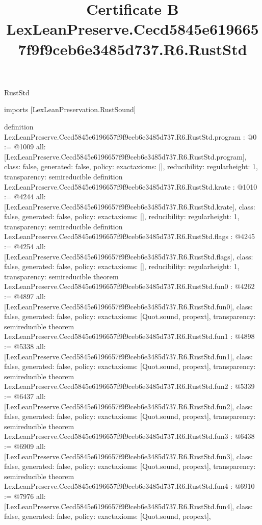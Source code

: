 \begin{lexlean}{RustStd}
\title{Certificate B LexLeanPreserve.Cecd5845e6196657f9f9ceb6e3485d737.R6.RustStd}
\begin{coremodule}
imports [LexLeanPreservation.RustSound]

definition LexLeanPreserve.Cecd5845e6196657f9f9ceb6e3485d737.R6.RustStd.program : @0 := @1009 {
  all: [LexLeanPreserve.Cecd5845e6196657f9f9ceb6e3485d737.R6.RustStd.program],
  class: false,
  generated: false,
  policy: exact{axioms: []},
  reducibility: regular{height: 1},
  transparency: semireducible
}
definition LexLeanPreserve.Cecd5845e6196657f9f9ceb6e3485d737.R6.RustStd.krate : @1010 := @4244 {
  all: [LexLeanPreserve.Cecd5845e6196657f9f9ceb6e3485d737.R6.RustStd.krate],
  class: false,
  generated: false,
  policy: exact{axioms: []},
  reducibility: regular{height: 1},
  transparency: semireducible
}
definition LexLeanPreserve.Cecd5845e6196657f9f9ceb6e3485d737.R6.RustStd.flags : @4245 := @4254 {
  all: [LexLeanPreserve.Cecd5845e6196657f9f9ceb6e3485d737.R6.RustStd.flags],
  class: false,
  generated: false,
  policy: exact{axioms: []},
  reducibility: regular{height: 1},
  transparency: semireducible
}
theorem LexLeanPreserve.Cecd5845e6196657f9f9ceb6e3485d737.R6.RustStd.fun0 : @4262 := @4897 {
  all: [LexLeanPreserve.Cecd5845e6196657f9f9ceb6e3485d737.R6.RustStd.fun0],
  class: false,
  generated: false,
  policy: exact{axioms: [Quot.sound, propext]},
  transparency: semireducible
}
theorem LexLeanPreserve.Cecd5845e6196657f9f9ceb6e3485d737.R6.RustStd.fun1 : @4898 := @5338 {
  all: [LexLeanPreserve.Cecd5845e6196657f9f9ceb6e3485d737.R6.RustStd.fun1],
  class: false,
  generated: false,
  policy: exact{axioms: [Quot.sound, propext]},
  transparency: semireducible
}
theorem LexLeanPreserve.Cecd5845e6196657f9f9ceb6e3485d737.R6.RustStd.fun2 : @5339 := @6437 {
  all: [LexLeanPreserve.Cecd5845e6196657f9f9ceb6e3485d737.R6.RustStd.fun2],
  class: false,
  generated: false,
  policy: exact{axioms: [Quot.sound, propext]},
  transparency: semireducible
}
theorem LexLeanPreserve.Cecd5845e6196657f9f9ceb6e3485d737.R6.RustStd.fun3 : @6438 := @6909 {
  all: [LexLeanPreserve.Cecd5845e6196657f9f9ceb6e3485d737.R6.RustStd.fun3],
  class: false,
  generated: false,
  policy: exact{axioms: [Quot.sound, propext]},
  transparency: semireducible
}
theorem LexLeanPreserve.Cecd5845e6196657f9f9ceb6e3485d737.R6.RustStd.fun4 : @6910 := @7976 {
  all: [LexLeanPreserve.Cecd5845e6196657f9f9ceb6e3485d737.R6.RustStd.fun4],
  class: false,
  generated: false,
  policy: exact{axioms: [Quot.sound, propext]},
}
\end{coremodule}
\end{lexlean}
